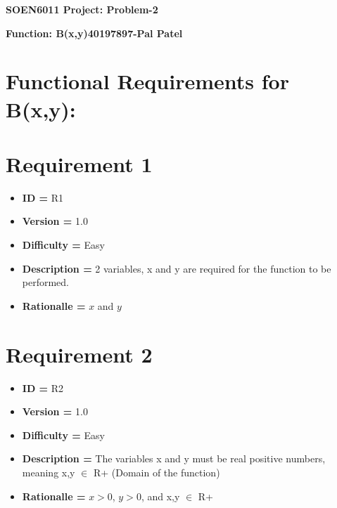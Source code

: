 \documentclass{article}
\begin{document}
\begin{center}\Large\textbf{SOEN6011 Project: Problem-2}\end{center}
\begin{center}\author{Pal Patel}\end{center}

\begin{flushleft}\Large\textbf{Function: B(x,y)}\hfill\textbf{40197897-Pal Patel}\end{flushleft}

\Large\section*{Functional Requirements for B(x,y):}

    \section*{Requirement 1}
    \begin{itemize}[noitemsep]
            \item \textbf{ID = } R1
            \item\textbf{Version = } 1.0
            \item\textbf{Difficulty = } Easy
            \item\textbf{Description = } 2 variables, x and y are required for the function to be performed.
            \item\textbf{Rationalle = } $x$ and $y$ 
        \end{itemize}

    \section*{Requirement 2}
    \begin{itemize}[noitemsep]
            \item \textbf{ID = } R2
            \item\textbf{Version = } 1.0
            \item\textbf{Difficulty = } Easy
            \item\textbf{Description = } The variables x and y must be real positive numbers, meaning x,y $\in$ R+ (Domain of the function)
            \item\textbf{Rationalle = } $x>0$, $y>0$, and x,y $\in$ R+
        \end{itemize}
        
\end{document}
